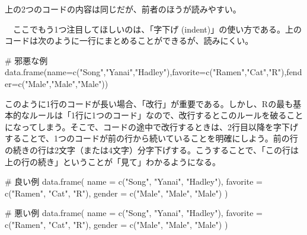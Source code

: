 \documentclass[
  a4paper,
  pandoc,
  ja=standard,
  jafont=haranoaji]{bxjsbook}
\newenvironment{Shaded}{\begin{snugshade}}{\end{snugshade}}
\newcommand{\AttributeTok}[1]{\textcolor[rgb]{0.00,0.48,0.65}{#1}}
\newcommand{\CommentTok}[1]{\textcolor[rgb]{0.37,0.37,0.37}{#1}}
\newcommand{\FunctionTok}[1]{\textcolor[rgb]{0.28,0.35,0.67}{#1}}
\newcommand{\NormalTok}[1]{\textcolor[rgb]{0.00,0.48,0.65}{#1}}
\newcommand{\StringTok}[1]{\textcolor[rgb]{0.13,0.47,0.30}{#1}}
\begin{document}
上の2つのコードの内容は同じだが、前者のほうが読みやすい。

　ここでもう1つ注目してほしいのは、「字下げ
(indent)」の使い方である。上のコードは次のように一行にまとめることができるが、読みにくい。

\begin{Shaded}
\begin{Highlighting}[numbers=left,,]
\CommentTok{\# 邪悪な例}
\FunctionTok{data.frame}\NormalTok{(}\AttributeTok{name=}\FunctionTok{c}\NormalTok{(}\StringTok{"Song"}\NormalTok{,}\StringTok{"Yanai"}\NormalTok{,}\StringTok{"Hadley"}\NormalTok{),}\AttributeTok{favorite=}\FunctionTok{c}\NormalTok{(}\StringTok{"Ramen"}\NormalTok{,}\StringTok{"Cat"}\NormalTok{,}\StringTok{"R"}\NormalTok{),}\AttributeTok{fender=}\FunctionTok{c}\NormalTok{(}\StringTok{"Male"}\NormalTok{,}\StringTok{"Male"}\NormalTok{,}\StringTok{"Male"}\NormalTok{))}
\end{Highlighting}
\end{Shaded}

このように1行のコードが長い場合、「改行」が重要である。しかし、Rの最も基本的なルールは「1行に1つのコード」なので、改行するとこのルールを破ることになってしまう。そこで、コードの途中で改行するときは、2行目以降を字下げすることで、1つのコードが前の行から続いていることを明確にしよう。前の行の続きの行は2文字（または4文字）分字下げする。こうすることで、「この行は上の行の続き」ということが「見て」わかるようになる。

\begin{Shaded}
\begin{Highlighting}[numbers=left,,]
\CommentTok{\# 良い例}
\FunctionTok{data.frame}\NormalTok{(}
  \AttributeTok{name     =} \FunctionTok{c}\NormalTok{(}\StringTok{"Song"}\NormalTok{,  }\StringTok{"Yanai"}\NormalTok{, }\StringTok{"Hadley"}\NormalTok{),}
  \AttributeTok{favorite =} \FunctionTok{c}\NormalTok{(}\StringTok{"Ramen"}\NormalTok{, }\StringTok{"Cat"}\NormalTok{,   }\StringTok{"R"}\NormalTok{),}
  \AttributeTok{gender   =} \FunctionTok{c}\NormalTok{(}\StringTok{"Male"}\NormalTok{,  }\StringTok{"Male"}\NormalTok{,  }\StringTok{"Male"}\NormalTok{)}
\NormalTok{)}

\CommentTok{\# 悪い例}
\FunctionTok{data.frame}\NormalTok{(}
\AttributeTok{name     =} \FunctionTok{c}\NormalTok{(}\StringTok{"Song"}\NormalTok{,  }\StringTok{"Yanai"}\NormalTok{, }\StringTok{"Hadley"}\NormalTok{),}
\AttributeTok{favorite =} \FunctionTok{c}\NormalTok{(}\StringTok{"Ramen"}\NormalTok{, }\StringTok{"Cat"}\NormalTok{,   }\StringTok{"R"}\NormalTok{),}
\AttributeTok{gender   =} \FunctionTok{c}\NormalTok{(}\StringTok{"Male"}\NormalTok{,  }\StringTok{"Male"}\NormalTok{,  }\StringTok{"Male"}\NormalTok{)}
\NormalTok{)}
\end{Highlighting}
\end{Shaded}
\end{document}
